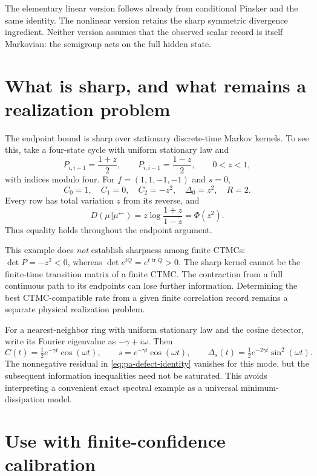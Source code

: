 The elementary linear version follows already from conditional Pinsker and
the same identity. The nonlinear version retains the sharp symmetric
divergence ingredient. Neither version assumes that the observed scalar
record is itself Markovian: the semigroup acts on the full hidden state.

\section{What is sharp, and what remains a realization problem}

The endpoint bound is sharp over stationary discrete-time Markov kernels.
To see this, take a four-state cycle with uniform stationary law and
\[
 P_{i,i+1}=\frac{1+z}{2},\qquad
 P_{i,i-1}=\frac{1-z}{2},\qquad 0<z<1,
\]
with indices modulo four. For $f=(1,1,-1,-1)$ and $s=0$,
\[
 C_0=1,\quad C_1=0,\quad C_2=-z^2,\quad
 \Delta_0=z^2,\quad R=2.
\]
Every row has total variation $z$ from its reverse, and
\[
 D(\mu\Vert\mu^\leftarrow)
 =z\log\frac{1+z}{1-z}=\Phi(z^2).
\]
Thus equality holds throughout the endpoint argument.

This example does \emph{not} establish sharpness among finite CTMCs:
$\det P=-z^2<0$, whereas $\det e^{tQ}=e^{t\operatorname{tr}Q}>0$.
The sharp kernel cannot be the finite-time transition matrix of a finite
CTMC. The contraction from a full continuous path to its endpoints can lose
further information. Determining the best CTMC-compatible rate from a given
finite correlation record remains a separate physical realization problem.

For a nearest-neighbor ring with uniform stationary law and the cosine
detector, write its Fourier eigenvalue as $-\gamma+i\omega$. Then
\[
 C(t)=\tfrac12 e^{-\gamma t}\cos(\omega t),\qquad
 s=e^{-\gamma t}\cos(\omega t),\qquad
 \Delta_s(t)=\tfrac12e^{-2\gamma t}\sin^2(\omega t).
\]
The nonnegative residual in \eqref{eq:pa-defect-identity} vanishes for this
mode, but the subsequent information inequalities need not be saturated.
This avoids interpreting a convenient exact spectral example as a universal
minimum-dissipation model.

\section{Use with finite-confidence calibration}

